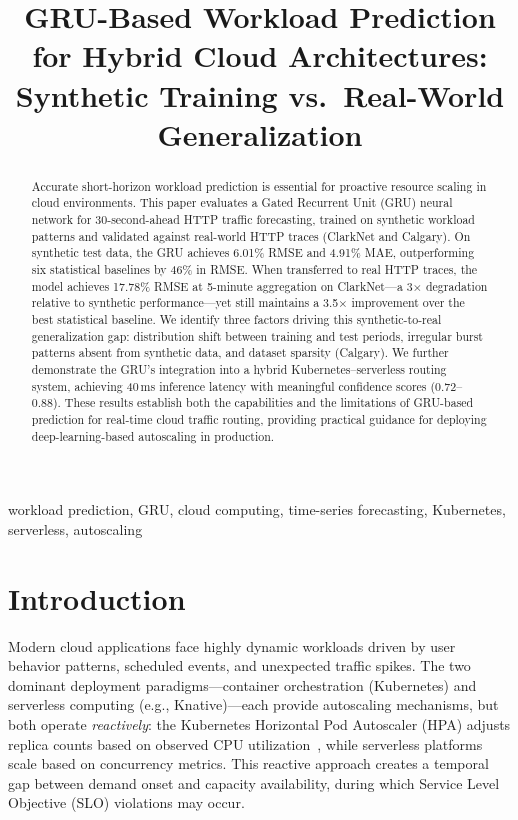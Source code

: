 \documentclass[conference,letterpaper]{IEEEtran}
\begin{document}
\title{GRU-Based Workload Prediction for Hybrid Cloud Architectures:\\Synthetic Training vs.\ Real-World Generalization}

\author{
}

\maketitle

\begin{abstract}
Accurate short-horizon workload prediction is essential for proactive resource scaling in cloud environments. This paper evaluates a Gated Recurrent Unit (GRU) neural network for 30-second-ahead HTTP traffic forecasting, trained on synthetic workload patterns and validated against real-world HTTP traces (ClarkNet and Calgary). On synthetic test data, the GRU achieves 6.01\% RMSE and 4.91\% MAE, outperforming six statistical baselines by 46\% in RMSE. When transferred to real HTTP traces, the model achieves 17.78\% RMSE at 5-minute aggregation on ClarkNet---a 3$\times$ degradation relative to synthetic performance---yet still maintains a 3.5$\times$ improvement over the best statistical baseline. We identify three factors driving this synthetic-to-real generalization gap: distribution shift between training and test periods, irregular burst patterns absent from synthetic data, and dataset sparsity (Calgary). We further demonstrate the GRU's integration into a hybrid Kubernetes--serverless routing system, achieving 40\,ms inference latency with meaningful confidence scores (0.72--0.88). These results establish both the capabilities and the limitations of GRU-based prediction for real-time cloud traffic routing, providing practical guidance for deploying deep-learning-based autoscaling in production.
\end{abstract}

\begin{IEEEkeywords}
workload prediction, GRU, cloud computing, time-series forecasting, Kubernetes, serverless, autoscaling
\end{IEEEkeywords}

\section{Introduction}

Modern cloud applications face highly dynamic workloads driven by user behavior patterns, scheduled events, and unexpected traffic spikes. The two dominant deployment paradigms---container orchestration (Kubernetes) and serverless computing (e.g., Knative)---each provide autoscaling mechanisms, but both operate \textit{reactively}: the Kubernetes Horizontal Pod Autoscaler (HPA) adjusts replica counts based on observed CPU utilization~\cite{burns2016borg}, while serverless platforms scale based on concurrency metrics. This reactive approach creates a temporal gap between demand onset and capacity availability, during which Service Level Objective (SLO) violations may occur.
\end{document}
